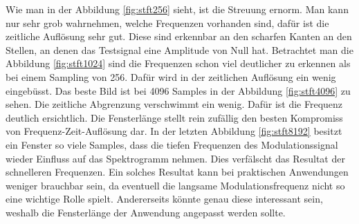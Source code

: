 Wie man in der Abbildung \ref{fig:stft256} sieht, ist die Streuung ernorm. Man kann nur sehr grob wahrnehmen, welche Frequenzen vorhanden sind, dafür ist die zeitliche Auflösung sehr gut. Diese sind erkennbar an den scharfen Kanten an den Stellen, an denen das Testsignal eine Amplitude von Null hat. 
Betrachtet man die Abbildung \ref{fig:stft1024} sind die Frequenzen schon viel deutlicher zu erkennen als bei einem Sampling von 256. Dafür wird in der zeitlichen Auflösung ein wenig eingebüsst.
Das beste Bild ist bei 4096 Samples in der Abbildung \ref{fig:stft4096} zu sehen. Die zeitliche Abgrenzung verschwimmt ein wenig. Dafür ist die Frequenz deutlich ersichtlich. Die Fensterlänge stellt rein zufällig den besten Kompromiss von Frequenz-Zeit-Auflösung dar.
In der letzten Abbildung \ref{fig:stft8192} besitzt ein Fenster so viele Samples, dass die tiefen Frequenzen des Modulationssignal wieder Einfluss auf das Spektrogramm nehmen. Dies verfälscht das Resultat der schnelleren Frequenzen. Ein solches Resultat kann bei praktischen Anwendungen weniger brauchbar sein, da eventuell die  langsame Modulationsfrequenz nicht so eine wichtige Rolle spielt. Andererseits könnte genau diese interessant sein, weshalb die Fensterlänge der Anwendung angepasst werden sollte.





